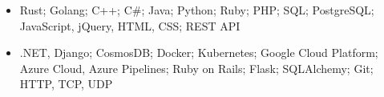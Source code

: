 \begin{cvsubsection}{}{}{}	
	\begin{itemize}
		\item Rust; Golang; C++; C\#; Java; Python; Ruby; PHP; SQL; PostgreSQL; JavaScript, jQuery, HTML, CSS; REST API
		\item .NET, Django; CosmosDB; Docker; Kubernetes; Google Cloud Platform; Azure Cloud, Azure Pipelines; Ruby on Rails; Flask; SQLAlchemy; Git; HTTP, TCP, UDP
	\end{itemize}
\end{cvsubsection}
